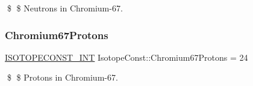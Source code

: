 \$ \$ Neutrons in Chromium-\/67. \mbox{\label{group___isotope_const-_chromium-_cr67_ga03dd0881c270074f38b654fdeb6e49ee}} 
\subsubsection{\texorpdfstring{Chromium67\+Protons}{Chromium67Protons}}
{\footnotesize\ttfamily \mbox{\hyperlink{group___isotope_const-_macros_ga5f18360b3e99483a35c32d789e62621c}{I\+S\+O\+T\+O\+P\+E\+C\+O\+N\+S\+T\+\_\+\+I\+NT}} Isotope\+Const\+::\+Chromium67\+Protons = 24}

\$ \$ Protons in Chromium-\/67. 